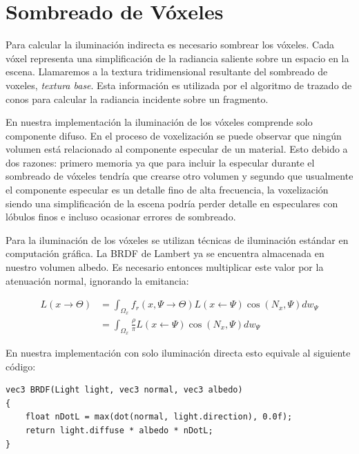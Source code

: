 \section{Sombreado de Vóxeles} %
\label{sec:sombreado_de_voxeles_impl}
Para calcular la iluminación indirecta es necesario sombrear los vóxeles. Cada vóxel representa una simplificación de la radiancia saliente sobre un espacio en la escena. Llamaremos a la textura tridimensional resultante del sombreado de voxeles, \emph{textura base}. Esta información es utilizada por el algoritmo de trazado de conos para calcular la radiancia incidente sobre un fragmento.

En nuestra implementación la iluminación de los vóxeles comprende solo componente difuso. En el proceso de voxelización se puede observar que ningún volumen está relacionado al componente especular de un material. Esto debido a dos razones: primero memoria ya que para incluir la especular durante el sombreado de vóxeles tendría que crearse otro volumen y segundo que usualmente el componente especular es un detalle fino de alta frecuencia, la voxelización siendo una simplificación de la escena podría perder detalle en especulares con lóbulos finos e incluso ocasionar errores de sombreado.

Para la iluminación de los vóxeles se utilizan técnicas de iluminación estándar en computación gráfica. La \ac{BRDF} de Lambert ya se encuentra almacenada en nuestro volumen albedo. Es necesario entonces multiplicar este valor por la atenuación normal, ignorando la emitancia:

\begin{equation}
	\begin{split}
		L(x\to\Theta) &= \int_{\Omega_{x}}{f_{r}(x, \Psi\to\Theta)L(x\gets\Psi)\cos(N_{x}, \Psi)dw_{\Psi}}\\
		&= \int_{\Omega_{x}}{\frac{\rho}{\pi}L(x\gets\Psi)\cos(N_{x}, \Psi)dw_{\Psi}}
	\end{split}
	\label{eq:shading_voxels}
\end{equation}

En nuestra implementación con solo iluminación directa esto equivale al siguiente código:
\\
\begin{lstlisting}[caption={Sombreado estándar para un vóxel}, label=Shading]
vec3 BRDF(Light light, vec3 normal, vec3 albedo)
{
	float nDotL = max(dot(normal, light.direction), 0.0f);
	return light.diffuse * albedo * nDotL;
}
\end{lstlisting}

